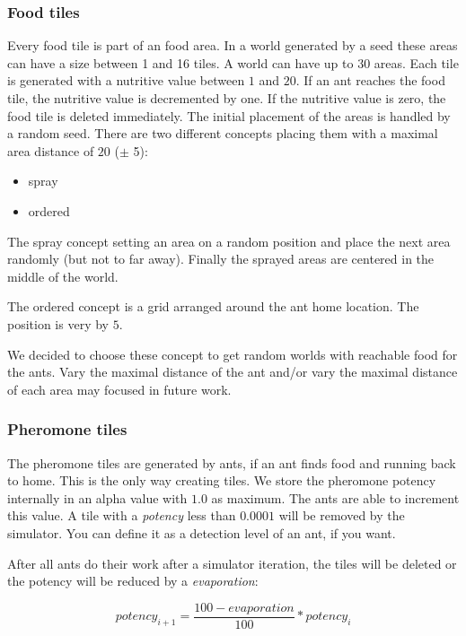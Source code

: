 \subsubsection{Food tiles}\label{food-tiles}

Every food tile is part of an food area. In a world generated by a seed
these areas can have a size between 1 and 16 tiles. A world can have up
to \(30\) areas. Each tile is generated with a nutritive value between
\(1\) and \(20\). If an ant reaches the food tile, the nutritive value
is decremented by one. If the nutritive value is zero, the food tile is
deleted immediately. The initial placement of the areas is handled by a
random seed. There are two different concepts placing them with a
maximal area distance of \(20\) (\(\pm\) 5):

\begin{itemize}
\tightlist
\item
  spray
\item
  ordered
\end{itemize}

The spray concept setting an area on a random position and place the
next area randomly (but not to far away). Finally the sprayed areas are
centered in the middle of the world.

The ordered concept is a grid arranged around the ant home location. The
position is very by \(5\).

We decided to choose these concept to get random worlds with reachable
food for the ants. Vary the maximal distance of the ant and/or vary the
maximal distance of each area may focused in future work.

\subsubsection{Pheromone tiles}\label{pheromone-tiles}

The pheromone tiles are generated by ants, if an ant finds food and
running back to home. This is the only way creating tiles. We store the
pheromone potency internally in an alpha value with \(1.0\) as maximum.
The ants are able to increment this value. A tile with a \emph{potency}
less than \(0.0001\) will be removed by the simulator. You can define it
as a detection level of an ant, if you want.

After all ants do their work after a simulator iteration, the tiles will
be deleted or the potency will be reduced by a \emph{evaporation}:

\[ potency_{i+1} = \frac{100 - evaporation}{100} * potency_{i} \]

